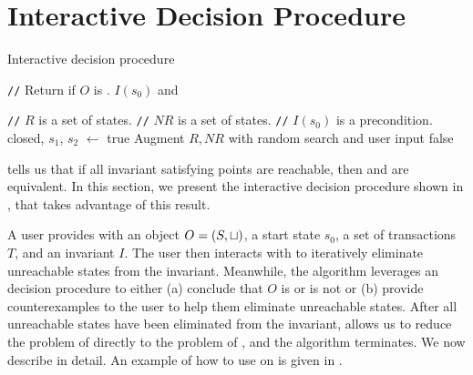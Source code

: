 \section{Interactive Decision Procedure}
\newcommand{\Helper}{\textsc{Helper}}
\newcommand{\IsIclosed}{\textsc{IsIclosed}}
\newcommand{\IsInvConfluent}{\textsc{IsInvConfluent}}

\newcommand{\algocomment}[1]{\State \textcolor{flatdenim}{\texttt{//} #1}}
\begin{algorithm}[t]
  \caption{Interactive \invariantconfluence{} decision procedure}%
  \begin{algorithmic}
    \algocomment{Return if $O$ is \sTIconfluent{}.}
      \State
        \Return $I(s_0)$ and
    \EndFunction

    \State

    \algocomment{$R$ is a set of \sTIreachable{} states.}
    \algocomment{$NR$ is a set of \sTIunreachable{} states.}
    \algocomment{$I(s_0)$ is a precondition.}
      \State closed, $s_1$, $s_2$ $\gets$ 
        \Return true
      \EndIf
      \State Augment $R, NR$ with random search and user input
        \Return false
      \EndIf
      \State \Return {}
    \EndFunction
  \end{algorithmic}
\end{algorithm}

 tells us that if all invariant
satisfying points are reachable, then \invariantclosure{} and
\invariantconfluence{} are equivalent. In this section, we present the
interactive \invariantconfluence{} decision procedure shown in
, that takes advantage of this result.

A user provides  with an object $O = (S,
\sqcup)$, a start state $s_0$, a set of transactions $T$, and an invariant
$I$. The user then interacts with  to
iteratively eliminate unreachable states from the invariant. Meanwhile, the
algorithm leverages an \invariantclosure{} decision procedure to either (a)
conclude that $O$ is or is not \sTIconfluent{} or (b) provide counterexamples
to the user to help them eliminate unreachable states. After all unreachable
states have been eliminated from the invariant,
 allows us to reduce the problem of
\invariantconfluence{} directly to the problem of \invariantclosure{}, and the
algorithm terminates.
%
We now describe  in detail. An example of
how to use  on  is given
in .

